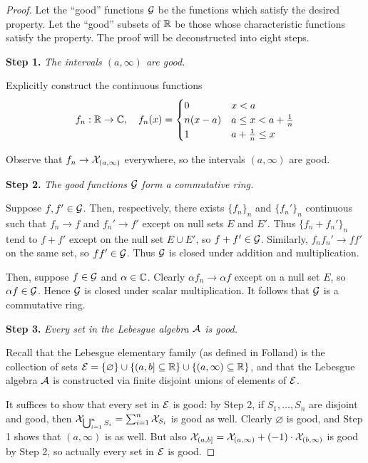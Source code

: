 \begin{proof}
    Let the ``good'' functions \(\mathcal{G}\) be the functions which satisfy the desired property. Let the ``good'' subsets of \(\mathbb{R}\) be those whose characteristic functions satisfy the property. The proof will be deconstructed into eight steps. 

    \textbf{Step 1.} \textit{The intervals \((a, \infty)\) are good.}

    Explicitly construct the continuous functions
    \[
    f_n : \mathbb{R} \to \mathbb{C}, \quad 
    f_n(x) = \begin{cases}
    0 & x < a \\
    n(x - a) & a \leq x < a + \frac{1}{n} \\
    1 & a + \frac{1}{n} \leq x
    \end{cases}
    \]

    Observe that \(f_n \to \mathcal{X}_{(a, \infty)}\) everywhere, so the intervals \((a, \infty)\) are good. 

    \textbf{Step 2.} \textit{The good functions \(\mathcal{G}\) form a commutative ring.}

    Suppose \(f, f' \in \mathcal{G}\). Then, respectively, there exists \(\{f_n\}_n\) and \(\{f_n'\}_n\) continuous such that \(f_n \to f\) and \(f_n' \to f'\) except on null sets \(E\) and \(E'\). Thus \(\{f_n + f_n'\}_n\) tend to \(f+f'\) except on the null set \(E \cup E'\), so \(f + f' \in \mathcal{G}\). Similarly, \(f_n f_n' \to ff'\) on the same set, so \(f f' \in \mathcal{G}\). Thus \(\mathcal{G}\) is closed under addition and multiplication.

    Then, suppose \(f \in \mathcal{G}\) and \(\alpha \in \mathbb{C}\). Clearly \(\alpha f_n \to \alpha f\) except on a null set \(E\), so \(\alpha f \in \mathcal{G}\). Hence \(\mathcal{G}\) is closed under scalar multiplication. It follows that \(\mathcal{G}\) is a commutative ring. 

    \textbf{Step 3.} \textit{Every set in the Lebesgue algebra \(\mathcal{A}\) is good.}

    Recall that the Lebesgue elementary family (as defined in Folland) is the collection of sets \(\mathcal{E} = \{ \varnothing \} \cup \{ (a, b] \subseteq \mathbb{R} \} \cup \{ (a, \infty) \subseteq \mathbb{R} \}\), and that the Lebesgue algebra \(\mathcal{A}\) is constructed via finite disjoint unions of elements of \(\mathcal{E}\). 
    
    It suffices to show that every set in \(\mathcal{E}\) is good: by Step 2, if \(S_1, \dots, S_n\) are disjoint and good, then \(\mathcal{X}_{\bigcup_{i=1}^n S_i} = \sum_{i=1}^n \mathcal{X}_{S_i}\) is good as well. Clearly \(\varnothing\) is good, and Step 1 shows that \((a, \infty)\) is as well. But also \(\mathcal{X}_{(a, b]} = \mathcal{X}_{(a, \infty)} + (-1) \cdot \mathcal{X}_{(b, \infty)}\) is good by Step 2, so actually every set in \(\mathcal{E}\) is good. 


\end{proof}
